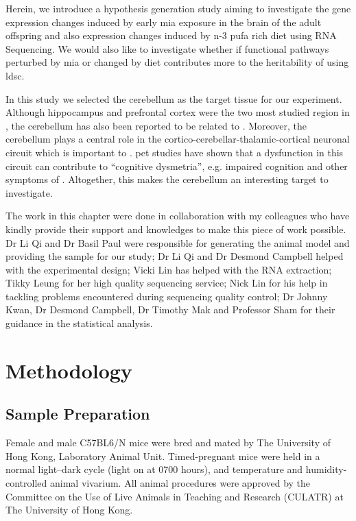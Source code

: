 Herein, we introduce a hypothesis generation study aiming to investigate the gene expression changes induced by early \gls{mia} exposure in the brain of the adult offspring and also expression changes induced by n-3 \gls{pufa} rich diet using RNA Sequencing.
We would also like to investigate whether if functional pathways perturbed by \gls{mia} or changed by diet contributes more to the heritability of  using \gls{ldsc}.

In this study we selected the cerebellum as the target tissue for our experiment. 
Although hippocampus \citep{Velakoulis2006,Nugent2007} and prefrontal cortex \citep{Knable1997,Perlstein2001} were the two most studied region in , the cerebellum has also been reported to be related to  \citep{Yeganeh-Doost2011,Andreasen2008}.
Moreover, the cerebellum plays a central role in the cortico-cerebellar-thalamic-cortical neuronal circuit which is important to .
\Gls{pet} studies have shown that a dysfunction in this circuit can contribute to ``cognitive dysmetria'', e.g. impaired cognition and other symptoms of  \citep{Yeganeh-Doost2011}.
Altogether, this makes the cerebellum an interesting target to investigate.

The work in this chapter were done in collaboration with my colleagues who have kindly provide their support and knowledges to make this piece of work possible.
Dr Li Qi and Dr Basil Paul were responsible for generating the animal model and providing the sample for our study;
Dr Li Qi and Dr Desmond Campbell helped with the experimental design;
Vicki Lin has helped with the RNA extraction; 
Tikky Leung for her high quality sequencing service;
Nick Lin for his help in tackling problems encountered during sequencing quality control; 
Dr Johnny Kwan, Dr Desmond Campbell, Dr Timothy Mak and Professor Sham for their guidance in the statistical analysis.

\section{Methodology}
\subsection{Sample Preparation}
Female and male C57BL6/N mice were bred and mated by The University of Hong Kong, Laboratory Animal Unit. 
Timed-pregnant mice were held in a normal light–dark cycle (light on at 0700 hours), and temperature and humidity-controlled animal vivarium. 
All animal procedures were approved by the Committee on the Use of Live Animals in Teaching and Research (CULATR) at The University of Hong Kong.

